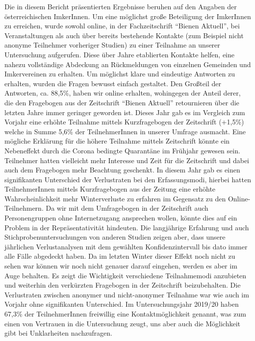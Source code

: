 Die in diesem Bericht präsentierten Ergebnisse beruhen auf den Angaben der österreichischen ImkerInnen. Um eine möglichst große Beteiligung der ImkerInnen zu erreichen, wurde sowohl online, in der Fachzeitschrift \enquote{Bienen Aktuell}, bei Veranstaltungen als auch über bereits bestehende Kontakte (zum Beispiel nicht anonyme Teilnehmer vorheriger Studien) zu einer Teilnahme an unserer Untersuchung aufgerufen. Diese über Jahre etablierten Kontakte helfen, eine nahezu vollständige Abdeckung an Rückmeldungen von einzelnen Gemeinden und Imkervereinen zu erhalten. Um möglichst klare und eindeutige Antworten zu erhalten, wurden die Fragen bewusst einfach gestaltet. Den Großteil der Antworten, ca. 88,5\%, haben wir online erhalten, wohingegen der Anteil derer, die den Fragebogen aus der Zeitschrift \enquote{Bienen Aktuell} retournieren über die letzten Jahre immer geringer geworden ist. Dieses Jahr gab es im Vergleich zum Vorjahr eine erhöhte Teilnahme mittels Kurzfragebogen der Zeitschrift (+1,5\%) welche in Summe 5,6\% der TeilnehmerInnen in unserer Umfrage ausmacht. Eine mögliche Erklärung für die höhere Teilnahme mittels Zeitschrift könnte ein Nebeneffekt durch die Corona bedingte Quarantäne im Frühjahr gewesen sein. Teilnehmer hatten vielleicht mehr Interesse und Zeit für die Zeitschrift und dabei auch dem Fragebogen mehr Beachtung geschenkt.
\newline
In diesem Jahr gab es einen signifikanten Unterschied der Verlustraten bei den Erfassungsmodi, hierbei hatten TeilnehmerInnen mittels Kurzfragebogen aus der Zeitung eine erhöhte Wahrscheinlichkeit mehr Winterverluste zu erfahren im Gegensatz zu den Online-Teilnehmern. Da wir mit dem Umfragebogen in der Zeitschrift auch Personengruppen ohne Internetzugang ansprechen wollen, könnte dies auf ein Problem in der Repräsentativität hindeuten. Die langjährige Erfahrung und auch Stichprobenuntersuchungen von anderen Studien zeigen aber, dass unsere jährlichen Verlustanalysen mit dem gewählten Konfidenzintervall bis dato immer alle Fälle abgedeckt haben. Da im letzten Winter dieser Effekt noch nicht zu sehen war können wir noch nicht genauer darauf eingehen, werden es aber im Auge behalten. Es zeigt die Wichtigkeit verschiedene Teilnahmemodi anzubieten und weiterhin den verkürzten Fragebogen in der Zeitschrift beizubehalten. Die Verlustraten zwischen anonymer und nicht-anonymer Teilnahme war wie auch im Vorjahr ohne signifikanten Unterschied. Im Untersuchungsjahr 2019/20 haben 67,3\% der TeilnehmerInnen freiwillig eine Kontaktmöglichkeit genannt, was zum einen von Vertrauen in die Untersuchung zeugt, uns aber auch die Möglichkeit gibt bei Unklarheiten nachzufragen.
